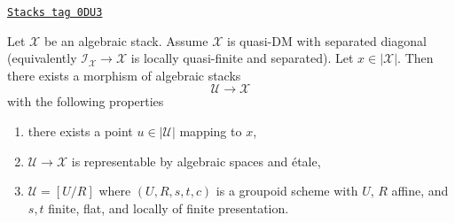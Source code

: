 \begin{lemma}
\label{stacks-morphisms-lemma-etale-local-quasi-DM}
\href{https://stacks.math.columbia.edu/tag/0DU3}{\texttt{Stacks tag 0DU3}}

Let $\mathcal{X}$ be an algebraic stack. Assume $\mathcal{X}$ is
quasi-DM with separated diagonal (equivalently
$\mathcal{I}_\mathcal{X} \to \mathcal{X}$ is locally quasi-finite and
separated). Let $x \in |\mathcal{X}|$. Then there exists a
morphism of algebraic stacks
$$
\mathcal{U} \longrightarrow \mathcal{X}
$$
with the following properties
\begin{enumerate}
\item there exists a point $u \in |\mathcal{U}|$ mapping to $x$,
\item $\mathcal{U} \to \mathcal{X}$ is representable by algebraic spaces and
\'etale,
\item $\mathcal{U} = [U/R]$ where $(U, R, s, t, c)$ is a groupoid
scheme with $U$, $R$ affine, and $s, t$ finite, flat, and
locally of finite presentation.
\end{enumerate}
\end{lemma}

